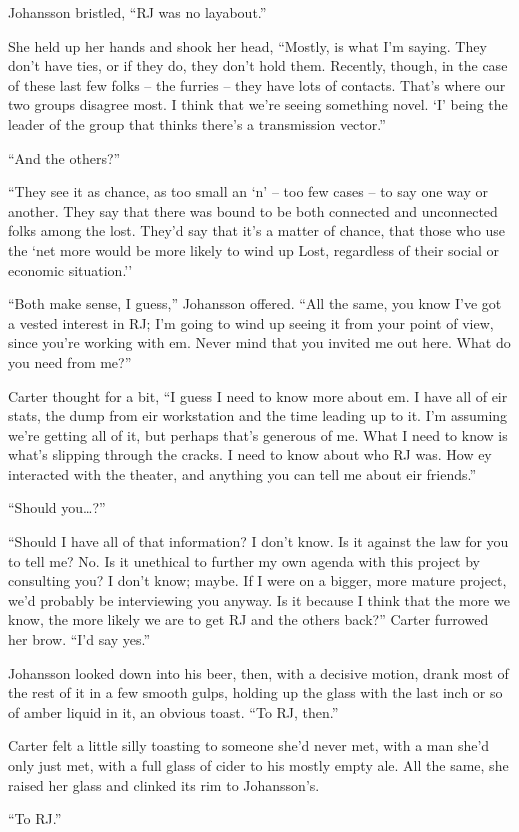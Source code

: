 Johansson bristled, ``RJ was no layabout.''

She held up her hands and shook her head, ``Mostly, is what I'm saying.  They don't have ties, or if they do, they don't hold them.  Recently, though, in the case of these last few folks -- the furries -- they have lots of contacts.  That's where our two groups disagree most.  I think that we're seeing something novel.  `I' being the leader of the group that thinks there's a transmission vector.''

``And the others?''

``They see it as chance, as too small an `n' -- too few cases -- to say one way or another.  They say that there was bound to be both connected and unconnected folks among the lost.  They'd say that it's a matter of chance, that those who use the `net more would be more likely to wind up Lost, regardless of their social or economic situation.''

``Both make sense, I guess,'' Johansson offered.  ``All the same, you know I've got a vested interest in RJ; I'm going to wind up seeing it from your point of view, since you're working with em.  Never mind that you invited me out here.  What do you need from me?''

Carter thought for a bit, ``I guess I need to know more about em.  I have all of eir stats, the dump from eir workstation and the time leading up to it.  I'm assuming we're getting all of it, but perhaps that's generous of me.  What I need to know is what's slipping through the cracks.  I need to know about who RJ was.  How ey interacted with the theater, and anything you can tell me about eir friends.''

``Should you\ldots{}?''

``Should I have all of that information?  I don't know.  Is it against the law for you to tell me?  No.  Is it unethical to further my own agenda with this project by consulting you?  I don't know; maybe.  If I were on a bigger, more mature project, we'd probably be interviewing you anyway.  Is it because I think that the more we know, the more likely we are to get RJ and the others back?''  Carter furrowed her brow.  ``I'd say yes.''

Johansson looked down into his beer, then, with a decisive motion, drank most of the rest of it in a few smooth gulps, holding up the glass with the last inch or so of amber liquid in it, an obvious toast.  ``To RJ, then.''

Carter felt a little silly toasting to someone she'd never met, with a man she'd only just met, with a full glass of cider to his mostly empty ale.  All the same, she raised her glass and clinked its rim to Johansson's.

``To RJ.''
